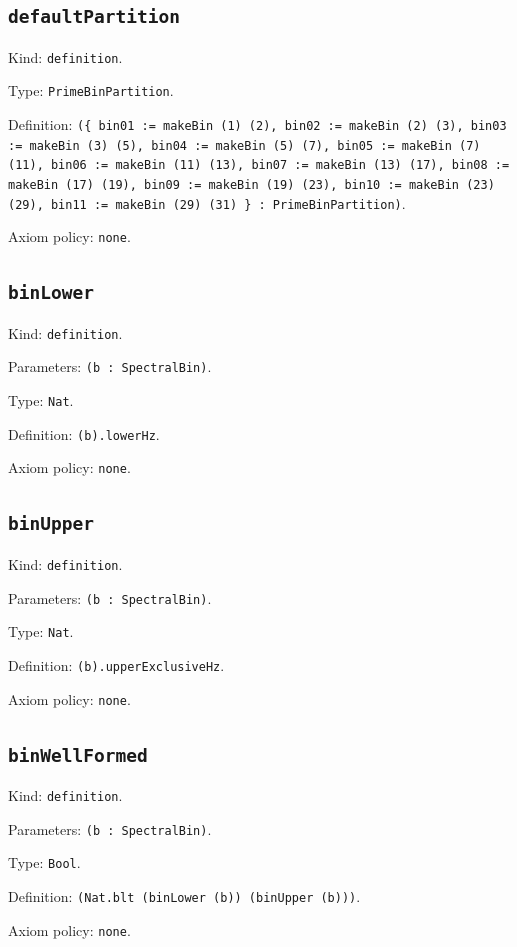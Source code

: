 \documentclass[11pt]{article}
\begin{document}
\subsection*{\texttt{defaultPartition}}
\noindent Kind: \texttt{definition}.\par
\noindent Type: \texttt{PrimeBinPartition}.\par
\noindent Definition: \texttt{(\{ bin01 := makeBin (1) (2), bin02 := makeBin (2) (3), bin03 := makeBin (3) (5), bin04 := makeBin (5) (7), bin05 := makeBin (7) (11), bin06 := makeBin (11) (13), bin07 := makeBin (13) (17), bin08 := makeBin (17) (19), bin09 := makeBin (19) (23), bin10 := makeBin (23) (29), bin11 := makeBin (29) (31) \} : PrimeBinPartition)}.\par
\noindent Axiom policy: \texttt{none}.\par
\subsection*{\texttt{binLower}}
\noindent Kind: \texttt{definition}.\par
\noindent Parameters: \texttt{(b : SpectralBin)}.\par
\noindent Type: \texttt{Nat}.\par
\noindent Definition: \texttt{(b).lowerHz}.\par
\noindent Axiom policy: \texttt{none}.\par
\subsection*{\texttt{binUpper}}
\noindent Kind: \texttt{definition}.\par
\noindent Parameters: \texttt{(b : SpectralBin)}.\par
\noindent Type: \texttt{Nat}.\par
\noindent Definition: \texttt{(b).upperExclusiveHz}.\par
\noindent Axiom policy: \texttt{none}.\par
\subsection*{\texttt{binWellFormed}}
\noindent Kind: \texttt{definition}.\par
\noindent Parameters: \texttt{(b : SpectralBin)}.\par
\noindent Type: \texttt{Bool}.\par
\noindent Definition: \texttt{(Nat.blt (binLower (b)) (binUpper (b)))}.\par
\noindent Axiom policy: \texttt{none}.\par
\end{document}
